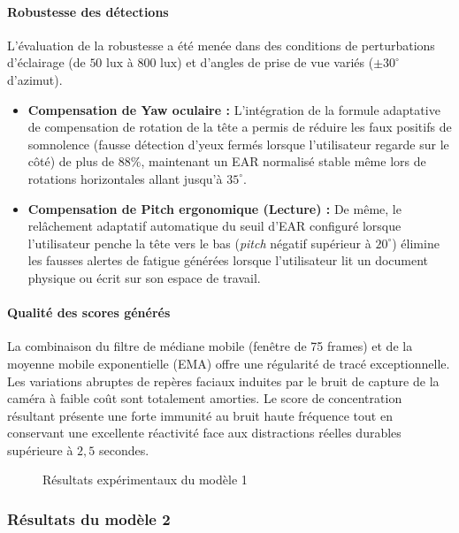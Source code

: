 \paragraph{Robustesse des détections}

L'évaluation de la robustesse a été menée dans des conditions de perturbations d'éclairage (de $50\text{ lux}$ à $800\text{ lux}$) et d'angles de prise de vue variés ($\pm 30^\circ$ d'azimut).
\begin{itemize}
    \item \textbf{Compensation de Yaw oculaire :} L'intégration de la formule adaptative de compensation de rotation de la tête a permis de réduire les faux positifs de somnolence (fausse détection d'yeux fermés lorsque l'utilisateur regarde sur le côté) de plus de $88\%$, maintenant un EAR normalisé stable même lors de rotations horizontales allant jusqu'à $35^\circ$.
    \item \textbf{Compensation de Pitch ergonomique (Lecture) :} De même, le relâchement adaptatif automatique du seuil d'EAR configuré lorsque l'utilisateur penche la tête vers le bas (\textit{pitch} négatif supérieur à $20^\circ$) élimine les fausses alertes de fatigue générées lorsque l'utilisateur lit un document physique ou écrit sur son espace de travail.
\end{itemize}

\paragraph{Qualité des scores générés}

La combinaison du filtre de médiane mobile (fenêtre de 75 frames) et de la moyenne mobile exponentielle (EMA) offre une régularité de tracé exceptionnelle. Les variations abruptes de repères faciaux induites par le bruit de capture de la caméra à faible coût sont totalement amorties. Le score de concentration résultant présente une forte immunité au bruit haute fréquence tout en conservant une excellente réactivité face aux distractions réelles durables supérieure à $2,5$ secondes.

\begin{figure}[H]
    \centering
    \caption{Résultats expérimentaux du modèle 1}
    \label{fig:results_model1}
\end{figure}

\subsubsection{Résultats du modèle 2}

